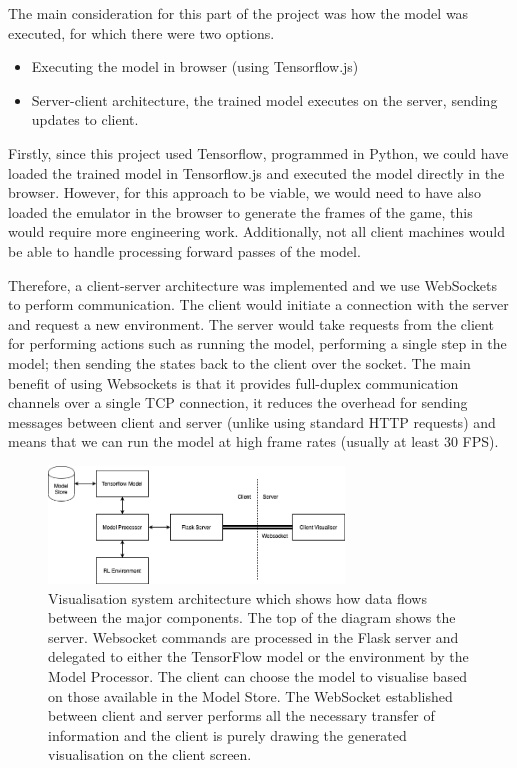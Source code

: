 The main consideration for this part of the project was how the model was executed, for which there were two options.

\begin{itemize}
	\item Executing the model in browser (using Tensorflow.js)
	\item Server-client architecture, the trained model executes on the server, sending updates to client.
\end{itemize}

Firstly, since this project used Tensorflow, programmed in Python, we could have loaded the trained model in Tensorflow.js and executed the model directly in the browser. However, for this approach to be viable, we would need to have also loaded the emulator in the browser to generate the frames of the game, this would require more engineering work. Additionally, not all client machines would be able to handle processing forward passes of the model.

Therefore, a client-server architecture was implemented and we use WebSockets to perform communication. The client would initiate a connection with the server and request a new environment. The server would take requests from the client for performing actions such as running the model, performing a single step in the model; then sending the states back to the client over the socket. The main benefit of using Websockets is that it provides full-duplex communication channels over a single TCP connection, it reduces the overhead for sending messages between client and server (unlike using standard HTTP requests) and means that we can run the model at high frame rates (usually at least 30 FPS).

\begin{figure}[htbp]
	\centering
	\includegraphics[width=0.70\textwidth]{chapters/chapter4/images/VizSystem.png}
	\caption[Visualisation system architecture]{Visualisation system architecture which shows how data flows between the major components. The top of the diagram shows the server. Websocket commands are processed in the Flask server and delegated to either the TensorFlow model or the environment by the Model Processor. The client can choose the model to visualise based on those available in the Model Store. The WebSocket established between client and server performs all the necessary transfer of information and the client is purely drawing the generated visualisation on the client screen.
		\label{fig:viz-system-arch}
	}
\end{figure}


